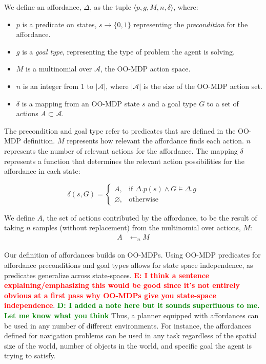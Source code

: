 \documentclass[conference]{IEEEtran}
\newcommand{\dnote}[1]{\textcolor{Green}{\textbf{D: #1}}}
\newcommand{\enote}[1]{\textcolor{Red}{\textbf{E: #1}}}
\begin{document}
 We define an affordance, $\Delta$, as the tuple $\langle p, g, M, n, \delta\rangle$,
where:
\begin{itemize}
\item $p$ is a predicate on states, $s \longrightarrow \{$0$, 1\}$ representing the {\em precondition} for the affordance. 
\item $g$ is a {\it goal type}, representing the type of problem the agent is solving.
\item $M$ is a multinomial over $\mathcal{A}$, the OO-MDP action space.
\item $n$ is an integer from $1$ to $|\mathcal{A}|$, where $|\mathcal{A}|$ is the size of the OO-MDP action set.
\item $\delta$ is a mapping from an OO-MDP state $s$ and a goal type $G$ to a set of actions $A \subset \mathcal{A}$.
\end{itemize}

The precondition and goal type refer to predicates that are defined in the OO-MDP definition.
$M$ represents how relevant the affordance finds each action. $n$ represents
the number of relevant actions for the affordance. The mapping $\delta$
represents a function that determines the relevant action possibilities for the affordance in each state:

\begin{equation}
\delta(s,G)= 
\begin{cases}
    A, & \text{if } \Delta.p(s) \wedge G \models \Delta.g \\
    \varnothing,              & \text{otherwise}
\end{cases}
\label{eq:delta_mapping}
\end{equation}

We define $A$, the set of actions contributed by the affordance, to be the result of taking $n$ samples (without replacement) from the multinomial over actions, $M$:
\begin{align}
A &\leftarrow_n M
\end{align}

Our definition of affordances builds on OO-MDPs. Using OO-MDP predicates for affordance
preconditions and goal types allows for state space independence, as predicates generalize across state-spaces. 
\enote{I think a sentence explaining/emphasizing this would be good since it's not entirely obvious at a first pass why OO-MDPs give you state-space independence}. \dnote{I added a note here but it sounds superfluous to me. Let me know what you think} 
Thus, a planner equipped with affordances can be used in any number of
different environments. For instance, the affordances defined for 
navigation problems can be used in any task regardless of the spatial size of the world, 
number of objects in the world, and specific goal the agent is trying to satisfy.
\end{document}
